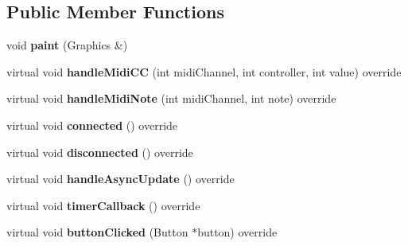 \subsection*{Public Member Functions}
\begin{DoxyCompactItemize}
\item 
void {\bfseries paint} (Graphics \&)\hypertarget{class_main_content_component_a897ff27920dedae2b120fe4e6a198815}{}\label{class_main_content_component_a897ff27920dedae2b120fe4e6a198815}

\item 
virtual void {\bfseries handle\+Midi\+CC} (int midi\+Channel, int controller, int value) override\hypertarget{class_main_content_component_a156f68ecd352b481d8ab6b9daeeb1917}{}\label{class_main_content_component_a156f68ecd352b481d8ab6b9daeeb1917}

\item 
virtual void {\bfseries handle\+Midi\+Note} (int midi\+Channel, int note) override\hypertarget{class_main_content_component_a45a06f0b1ac2b7f97d759f70be3cc1d8}{}\label{class_main_content_component_a45a06f0b1ac2b7f97d759f70be3cc1d8}

\item 
virtual void {\bfseries connected} () override\hypertarget{class_main_content_component_a17a320849296be1f080bb24d92c069e4}{}\label{class_main_content_component_a17a320849296be1f080bb24d92c069e4}

\item 
virtual void {\bfseries disconnected} () override\hypertarget{class_main_content_component_a06efe52a519e42c8f1170a3035a160d6}{}\label{class_main_content_component_a06efe52a519e42c8f1170a3035a160d6}

\item 
virtual void {\bfseries handle\+Async\+Update} () override\hypertarget{class_main_content_component_a9be726b895f68c0e9163d618ee4d20f6}{}\label{class_main_content_component_a9be726b895f68c0e9163d618ee4d20f6}

\item 
virtual void {\bfseries timer\+Callback} () override\hypertarget{class_main_content_component_a5b7e48a7423f17bc799fc2990f48e38d}{}\label{class_main_content_component_a5b7e48a7423f17bc799fc2990f48e38d}

\item 
virtual void {\bfseries button\+Clicked} (Button $\ast$button) override\hypertarget{class_main_content_component_a72d6b006f4d4a6c4de2ca2e1bde18fc6}{}\label{class_main_content_component_a72d6b006f4d4a6c4de2ca2e1bde18fc6}


\end{DoxyCompactItemize}

